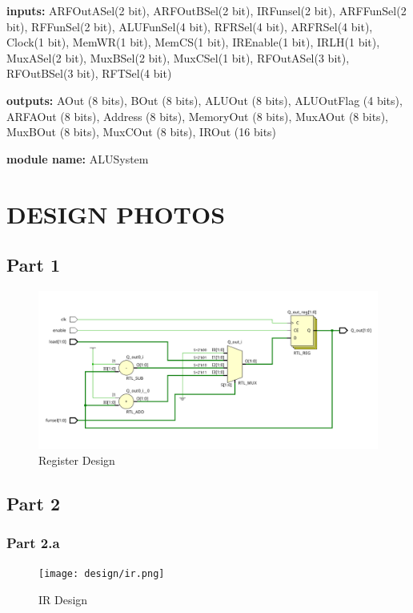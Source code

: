 \documentclass[pdftex,12pt,a4paper]{article}
\begin{document}
	


	\textbf{inputs:}
	ARFOutASel(2 bit), ARFOutBSel(2 bit), IRFunsel(2 bit), ARFFunSel(2 bit),
	RFFunSel(2 bit), ALUFunSel(4 bit), RFRSel(4 bit), ARFRSel(4 bit),
	Clock(1 bit), MemWR(1 bit), MemCS(1 bit), IREnable(1 bit),
	IRLH(1 bit), MuxASel(2 bit), MuxBSel(2 bit), MuxCSel(1 bit),
	RFOutASel(3 bit), RFOutBSel(3 bit), RFTSel(4 bit)


	\textbf{outputs:} 
	AOut (8 bits),
    BOut (8 bits),
    ALUOut (8 bits),
    ALUOutFlag (4 bits),
    ARFAOut (8 bits),
    Address (8 bits),
    MemoryOut (8 bits), 
    MuxAOut (8 bits), 
    MuxBOut (8 bits),
    MuxCOut (8 bits),
    IROut (16 bits)

	\textbf{module name:} ALUSystem







\section{DESIGN PHOTOS}
\subsection{Part 1}
\begin{figure}[H]
	\centering
	\includegraphics[width=1\textwidth]{design/register.png}	
	\caption{Register Design}
	\label{Register Design}
\end{figure}



\subsection{Part 2}
\subsubsection{Part 2.a}
\begin{figure}[H]
	\centering
	\texttt{[image: design/ir.png]}	
	\caption{IR Design}
	\label{IR Design}
\end{figure}
\end{document}
